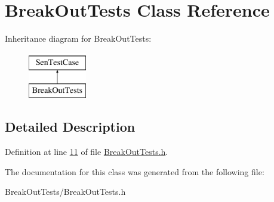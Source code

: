 \hypertarget{interface_break_out_tests}{\section{Break\-Out\-Tests Class Reference}
\label{d8/d91/interface_break_out_tests}
}
Inheritance diagram for Break\-Out\-Tests\-:\begin{figure}[H]
\begin{center}
\leavevmode
\includegraphics[height=2.000000cm]{d8/d91/interface_break_out_tests}
\end{center}
\end{figure}


\subsection{Detailed Description}


Definition at line \hyperlink{_break_out_tests_8h_source_l00011}{11} of file \hyperlink{_break_out_tests_8h_source}{Break\-Out\-Tests.\-h}.



The documentation for this class was generated from the following file\-:\begin{DoxyCompactItemize}
\item 
Break\-Out\-Tests/Break\-Out\-Tests.\-h\end{DoxyCompactItemize}
